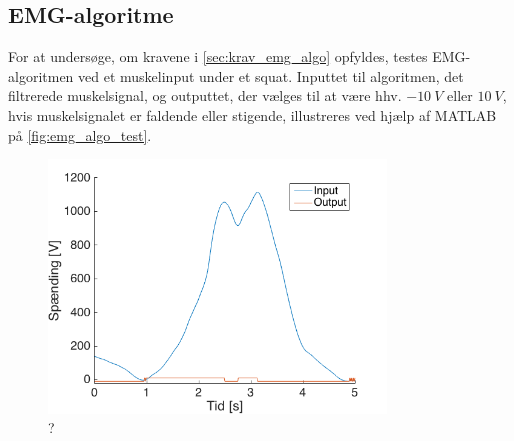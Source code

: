 \subsection{EMG-algoritme}
For at undersøge, om kravene i \autoref{sec:krav_emg_algo} opfyldes, testes EMG-algoritmen ved et muskelinput under et squat. Inputtet til algoritmen, det filtrerede muskelsignal, og outputtet, der vælges til at være hhv. $-10~V$ eller $10~V$, hvis muskelsignalet er faldende eller stigende, illustreres ved hjælp af MATLAB på \autoref{fig:emg_algo_test}. 

\begin{figure}[H]
\centering
\includegraphics[width=0.8\textwidth]{figures/EMG_algo_test}
\caption{?}
\label{fig:emg_algo_test}
\end{figure}